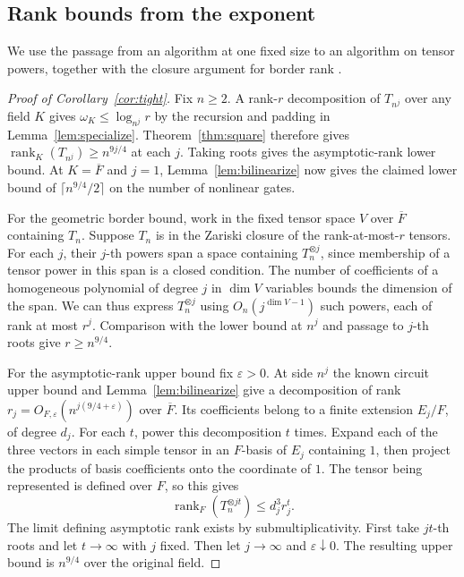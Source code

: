 \subsection{Rank bounds from the exponent}\label{sec:finite-ranks}
We use the passage from an algorithm at one fixed size to an algorithm
on tensor powers, together with the closure argument for border rank
\cite{bini,bcs,spectrum}.

\begin{proof}[Proof of Corollary~\ref{cor:tight}]
Fix \(n\ge2\). A rank-\(r\) decomposition of \(T_{n^j}\) over any field
\(K\) gives \(\omega_K\le\log_{n^j} r\) by the recursion and padding in
Lemma~\ref{lem:specialize}. Theorem~\ref{thm:square} therefore gives
\(\operatorname{rank}_K(T_{n^j})\ge n^{9j/4}\) at each \(j\). Taking
roots gives the asymptotic-rank lower bound. At \(K=\overline F\) and
\(j=1\), Lemma~\ref{lem:bilinearize} now gives the claimed lower bound
of \(\lceil n^{9/4}/2\rceil\) on the number of nonlinear gates.

For the geometric border bound, work in the fixed tensor space \(V\)
over \(\overline F\) containing \(T_n\). Suppose \(T_n\) is in the
Zariski closure of the rank-at-most-\(r\) tensors. For each \(j\),
their \(j\)-th powers span a space containing \(T_n^{\otimes j}\),
since membership of a tensor power in this span is a closed condition.
The number of coefficients of a homogeneous polynomial of degree \(j\)
in \(\dim V\) variables bounds the dimension of the span. We can thus
express \(T_n^{\otimes j}\) using \(O_n(j^{\dim V-1})\) such powers,
each of rank at most \(r^j\). Comparison with the lower bound at
\(n^j\) and passage to \(j\)-th roots give \(r\ge n^{9/4}\).

For the asymptotic-rank upper bound fix \(\varepsilon>0\). At side \(n^j\)
the known circuit upper bound and Lemma~\ref{lem:bilinearize} give a
decomposition of rank \(r_j=O_{F,\varepsilon}(n^{j(9/4+\varepsilon)})\)
over \(\overline F\). Its coefficients belong to a finite extension
\(E_j/F\), of degree \(d_j\). For each \(t\), power this decomposition
\(t\) times. Expand each of the three vectors in each simple tensor
in an \(F\)-basis of \(E_j\) containing \(1\), then project the
products of basis coefficients onto the coordinate of \(1\).
The tensor being represented is defined over \(F\), so this gives
\[
        \operatorname{rank}_F(T_n^{\otimes jt})\le d_j^3 r_j^t .
\]
The limit defining asymptotic rank exists by submultiplicativity.
First take \(jt\)-th roots and let \(t\to\infty\) with \(j\) fixed.
Then let \(j\to\infty\) and \(\varepsilon\downarrow0\). The resulting
upper bound is \(n^{9/4}\) over the original field.
\end{proof}

